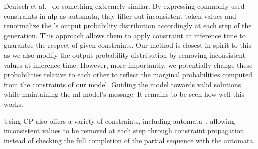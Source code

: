 \documentclass[../Document.tex]{subfiles}
\begin{document}
Deutsch et al.~\cite{deutsch2019general} do something extremely similar. By expressing commonly-used constraints in \gls{nlp} as automata, they filter out inconsistent token values and renormalize the \nn's output probability distribution accordingly at each step of the generation.
This approach allows them to apply constraint at inference time to guarantee the respect of given constraints.
Our method is closest in spirit to this as we also modify the output probability distribution by removing inconsistent values at inference time.
However, more importantly, we potentially change these probabilities relative to each other to reflect the marginal probabilities computed from the constraints of our \cp model.
Guiding the model towards valid solutions while maintaining the \gls{ml} model's message.
It remains to be seen how well this works.

Using CP also offers a variety of constraints, including automata~\cite{DBLP:conf/cp/Pesant04}, allowing inconsistent values to be removed at each step through constraint propagation instead of checking the full completion of the partial sequence with the automata.
\end{document}
